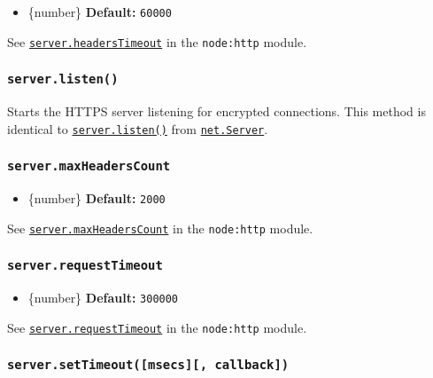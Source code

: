 \begin{itemize}
\tightlist
\item
  \{number\} \textbf{Default:} \texttt{60000}
\end{itemize}

See \href{http.md\#serverheaderstimeout}{\texttt{server.headersTimeout}}
in the \texttt{node:http} module.

\subsubsection{\texorpdfstring{\texttt{server.listen()}}{server.listen()}}\label{server.listen}

Starts the HTTPS server listening for encrypted connections. This method
is identical to \href{net.md\#serverlisten}{\texttt{server.listen()}}
from \href{net.md\#class-netserver}{\texttt{net.Server}}.

\subsubsection{\texorpdfstring{\texttt{server.maxHeadersCount}}{server.maxHeadersCount}}\label{server.maxheaderscount}

\begin{itemize}
\tightlist
\item
  \{number\} \textbf{Default:} \texttt{2000}
\end{itemize}

See
\href{http.md\#servermaxheaderscount}{\texttt{server.maxHeadersCount}}
in the \texttt{node:http} module.

\subsubsection{\texorpdfstring{\texttt{server.requestTimeout}}{server.requestTimeout}}\label{server.requesttimeout}

\begin{itemize}
\tightlist
\item
  \{number\} \textbf{Default:} \texttt{300000}
\end{itemize}

See \href{http.md\#serverrequesttimeout}{\texttt{server.requestTimeout}}
in the \texttt{node:http} module.

\subsubsection{\texorpdfstring{\texttt{server.setTimeout({[}msecs{]}{[},\ callback{]})}}{server.setTimeout({[}msecs{]}{[}, callback{]})}}\label{server.settimeoutmsecs-callback}

